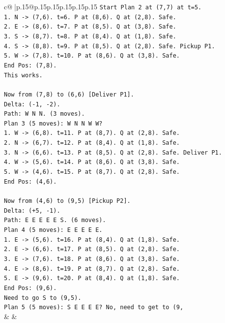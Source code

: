 \documentclass{article}
\begin{document}
{\begin{supertabular}{c@{$\;$}|p{.15\linewidth}@{}p{.15\linewidth}p{.15\linewidth}p{.15\linewidth}p{.15\linewidth}p{.15\linewidth}}
{{{\texttt{Start Plan 2 at (7,7) at t=5.} \\
\texttt{1. N {-}> (7,6). t=6. P at (8,6). Q at (2,8). Safe.} \\
\texttt{2. E {-}> (8,6). t=7. P at (8,5). Q at (3,8). Safe.} \\
\texttt{3. S {-}> (8,7). t=8. P at (8,4). Q at (1,8). Safe.} \\
\texttt{4. S {-}> (8,8). t=9. P at (8,5). Q at (2,8). Safe. Pickup P1.} \\
\texttt{5. W {-}> (7,8). t=10. P at (8,6). Q at (3,8). Safe.} \\
\texttt{End Pos: (7,8).} \\
\texttt{This works.} \\
\\ 
\texttt{Now from (7,8) to (6,6) {[}Deliver P1{]}.} \\
\texttt{Delta: ({-}1, {-}2).} \\
\texttt{Path: W N N. (3 moves).} \\
\texttt{Plan 3 (5 moves): W N N W W?} \\
\texttt{1. W {-}> (6,8). t=11. P at (8,7). Q at (2,8). Safe.} \\
\texttt{2. N {-}> (6,7). t=12. P at (8,4). Q at (1,8). Safe.} \\
\texttt{3. N {-}> (6,6). t=13. P at (8,5). Q at (2,8). Safe. Deliver P1.} \\
\texttt{4. W {-}> (5,6). t=14. P at (8,6). Q at (3,8). Safe.} \\
\texttt{5. W {-}> (4,6). t=15. P at (8,7). Q at (2,8). Safe.} \\
\texttt{End Pos: (4,6).} \\
\\ 
\texttt{Now from (4,6) to (9,5) {[}Pickup P2{]}.} \\
\texttt{Delta: (+5, {-}1).} \\
\texttt{Path: E E E E E S. (6 moves).} \\
\texttt{Plan 4 (5 moves): E E E E E.} \\
\texttt{1. E {-}> (5,6). t=16. P at (8,4). Q at (1,8). Safe.} \\
\texttt{2. E {-}> (6,6). t=17. P at (8,5). Q at (2,8). Safe.} \\
\texttt{3. E {-}> (7,6). t=18. P at (8,6). Q at (3,8). Safe.} \\
\texttt{4. E {-}> (8,6). t=19. P at (8,7). Q at (2,8). Safe.} \\
\texttt{5. E {-}> (9,6). t=20. P at (8,4). Q at (1,8). Safe.} \\
\texttt{End Pos: (9,6).} \\
\texttt{Need to go S to (9,5).} \\
\texttt{Plan 5 (5 moves): S E E E E? No, need to get to (9,} \\
            }
        }
    }
    & & \\ \\


\end{supertabular}}
\end{document}
